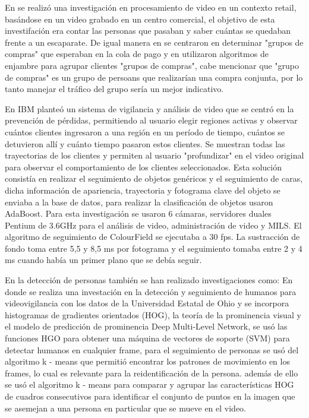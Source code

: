 \documentclass[conference]{IEEEtran}
\begin{document}
En \cite{ellis2002performance} se realizó una investigación en procesamiento de video en un contexto retail, basándose en un video grabado en un centro comercial, el objetivo de esta investifación era contar las personas que pasaban y saber cuántas se quedaban frente a un escaparate. De igual manera en \cite{haritaoglu2001detection} se centraron en determinar "grupos de compras" que esperaban en la cola de pago y en \cite{leykin2007detecting} utilizaron algoritmos de enjambre para agrupar clientes "grupos de compras", cabe mencionar que "grupo de compras" es un grupo de persoans que realizarían una compra conjunta, por lo tanto manejar el tráfico del grupo sería un mejor indicativo.

En \cite{senior2007video} IBM planteó un sistema de vigilancia y análisis de video que se centró en la prevención de pérdidas, permitiendo al usuario elegir regiones activas y observar cuántos clientes ingresaron a una región en un período de tiempo, cuántos se detuvieron allí y cuánto tiempo pasaron estos clientes. Se muestran todas las trayectorias de los clientes y permiten al usuario "profundizar" en el video original para observar el comportamiento de los clientes seleccionados. Esta solución consistía en realizar el seguimiento de objetos genéricos y el seguimiento de caras, dicha información de apariencia, trayectoria y fotograma clave del objeto se enviaba a la base de datos, para realizar la clasificación de objetos usaron AdaBoost. Para esta investigación se usaron 6 cámaras, servidores duales Pentium de 3.6GHz para el análisis de video, administración de video y MILS. El algoritmo de seguimiento de ColourField se ejecutaba a 30 fps. La sustracción de fondo toma entre 5,5 y 8,5 ms por fotograma y el seguimiento tomaba entre 2 y 4 ms cuando había un primer plano que se debía seguir.

En la detección de personas también se han realizado investigaciones como:
En \cite{gajjar2017human} donde se realiza una investación en la detección y seguimiento de humanos para videovigilancia con los datos de la Universidad Estatal de Ohio y se incorpora histogramas de gradientes orientados (HOG), la teoría de la prominencia visual y el modelo de predicción de prominencia Deep Multi-Level Network, se usó las funciones HGO para obtener una máquina de vectores de soporte (SVM) para detectar humanos en cualquier frame, para el seguimiento de personas se usó del algoritmo k - means que permitió encontrar los patrones de movimiento en los frames, lo cual es relevante para la reidentificación de la persona. además de ello se usó el algoritmo k - means para comparar y agrupar las características HOG de cuadros consecutivos para identificar el conjunto de puntos en la imagen que se asemejan a una persona en particular que se mueve en el video.
\end{document}
